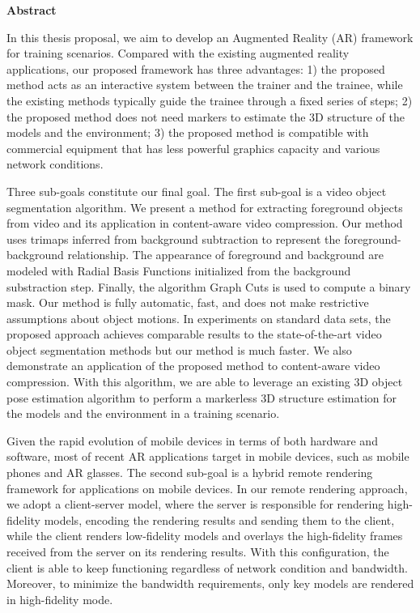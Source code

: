 
\begin{center}\textbf{Abstract}\end{center}

In this thesis proposal, we aim to develop an Augmented Reality (AR) framework for training scenarios.
Compared with the existing augmented reality applications, our proposed framework has three advantages: 1) the proposed method acts as an interactive system between the trainer and the trainee, while the existing methods typically guide the trainee through a fixed series of steps; 2) the proposed method does not need markers to estimate the 3D structure of the models and the environment; 3) the proposed method is compatible with commercial equipment that has less powerful graphics capacity and various network conditions.

Three sub-goals constitute our final goal.
The first sub-goal is a video object segmentation algorithm.
We present a method for extracting foreground objects from video and its application in content-aware video compression. Our method uses trimaps inferred from background subtraction to represent the foreground-background relationship. The appearance of foreground and background are modeled with Radial Basis Functions initialized from the background substraction step. Finally, the algorithm Graph Cuts is used to compute a binary mask. Our method is fully automatic, fast, and does not make restrictive assumptions about object motions. In experiments on standard data sets, the proposed approach achieves comparable results to the state-of-the-art video object segmentation methods but our method is much faster. We also demonstrate an application of the proposed method to content-aware video compression.
With this algorithm, we are able to leverage an existing 3D object pose estimation algorithm to perform a markerless 3D structure estimation for the models and the environment in a training scenario.

Given the rapid evolution of mobile devices in terms of both hardware and software, most of recent AR applications target in mobile devices, such as mobile phones and AR glasses.
The second sub-goal is a hybrid remote rendering framework for applications on mobile devices. In our remote rendering approach, we adopt a client-server model, where the server is responsible for rendering high-fidelity models, encoding the rendering results and sending them to the client, while the client renders low-fidelity models and overlays the high-fidelity frames received from the server on its rendering results. With this configuration, the client is able to keep functioning regardless of network condition and bandwidth. Moreover, to minimize the bandwidth requirements, only key models are rendered in high-fidelity mode.

